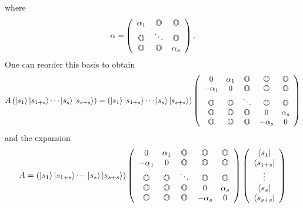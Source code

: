 where 
\begin{equation}
{\bf \alpha =}\left( 
\begin{array}{ccc}
\alpha _{1} & {\Bbb O} & {\Bbb O} \\ 
{\Bbb O} & \ddots & {\Bbb O} \\ 
{\Bbb O} & {\Bbb O} & \alpha _{s}%
\end{array}%
\right) .
\end{equation}%
One can reorder this basis to obtain 
\begin{equation}
A\left( \left\vert s_{1}\right\rangle \left\vert s_{1+s}\right\rangle \cdots
\left\vert s_{s}\right\rangle \left\vert s_{s+s}\right\rangle \right)
=\left( \left\vert s_{1}\right\rangle \left\vert s_{1+s}\right\rangle \cdots
\left\vert s_{s}\right\rangle \left\vert s_{s+s}\right\rangle \right) \left( 
\begin{array}{ccccc}
0 & \alpha _{1} & {\Bbb O} & {\Bbb O} & {\Bbb O} \\ 
-\alpha _{1} & 0 & {\Bbb O} & {\Bbb O} & {\Bbb O} \\ 
{\Bbb O} & {\Bbb O} & \ddots & {\Bbb O} & {\Bbb O} \\ 
{\Bbb O} & {\Bbb O} & {\Bbb O} & 0 & \alpha _{s} \\ 
{\Bbb O} & {\Bbb O} & {\Bbb O} & -\alpha _{s} & 0%
\end{array}%
\right)
\end{equation}%
and the expansion 
\begin{equation}
A=\left( \left\vert s_{1}\right\rangle \left\vert s_{1+s}\right\rangle
\cdots \left\vert s_{s}\right\rangle \left\vert s_{s+s}\right\rangle \right)
\left( 
\begin{array}{ccccc}
0 & \alpha _{1} & {\Bbb O} & {\Bbb O} & {\Bbb O} \\ 
-\alpha _{1} & 0 & {\Bbb O} & {\Bbb O} & {\Bbb O} \\ 
{\Bbb O} & {\Bbb O} & \ddots & {\Bbb O} & {\Bbb O} \\ 
{\Bbb O} & {\Bbb O} & {\Bbb O} & 0 & \alpha _{s} \\ 
{\Bbb O} & {\Bbb O} & {\Bbb O} & -\alpha _{s} & 0%
\end{array}%
\right) \left( 
\begin{array}{c}
\left\langle s_{1}\right\vert \\ 
\left\langle s_{1+s}\right\vert \\ 
\vdots \\ 
\left\langle s_{s}\right\vert \\ 
\left\langle s_{s+s}\right\vert%
\end{array}%
\right)  \label{reex}
\end{equation}%
